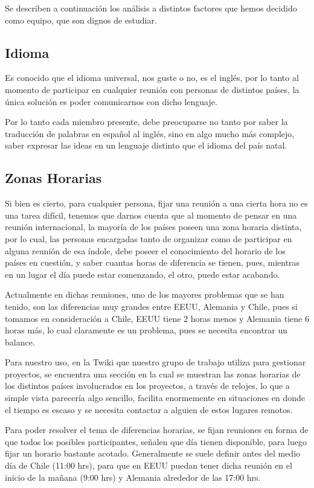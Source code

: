 Se describen a continuación los análisis a distintos factores que hemos
decidido como equipo, que son dignos de estudiar.

\subsection{Idioma}
Es conocido que el idioma universal, nos guste o no,
es el inglés, por lo tanto al momento de participar en
cualquier reunión con personas de distintos países,
la única solución es poder comunicarnos con dicho lenguaje.

Por lo tanto cada miembro presente, debe preocuparse no tanto
por saber la traducción de palabras en español al inglés,
sino en algo mucho más complejo, saber expresar las ideas
en un lenguaje distinto que el idioma del país natal.


\subsection{Zonas Horarias}
Si bien es cierto, para cualquier persona, fijar una reunión
a una cierta hora no es una tarea difícil, tenemos que darnos
cuenta que al momento de pensar en una reunión internacional,
la mayoría de los países poseen una zona horaria distinta, por
lo cual, las personas encargadas tanto de organizar como de
participar en alguna reunión de esa índole, debe poseer el
conocimiento del horario de los países en cuestión,
y saber cuantas horas de diferencia se tienen, pues, mientras
en un lugar el día puede estar comenzando, el otro, puede estar
acabando.

Actualmente en dichas reuniones, uno de los mayores problemas
que se han tenido, son las diferencias muy grandes entre EEUU, 
Alemania y Chile, pues si tomamos en consideración a Chile,
EEUU tiene 2 horas menos y Alemania tiene 6 horas más, lo cual
claramente es un problema, pues se necesita encontrar un balance.

Para nuestro uso, en la Twiki que nuestro grupo de trabajo
utiliza para gestionar proyectos, se encuentra una sección en la cual
se muestran las zonas horarias de los distintos países involucrados
en los proyectos, a través de relojes, lo que a simple vista parecería
algo sencillo, facilita enormemente en situaciones en donde el tiempo
es escaso y se necesita contactar a alguien de estos lugares remotos.

Para poder resolver el tema de diferencias horarias, se fijan reuniones
en forma de que todos los posibles participantes, señalen que día tienen
disponible, para luego fijar un horario bastante acotado. Generalmente
se suele definir antes del medio día de Chile (11:00 hrs), para que en EEUU puedan 
tener dicha reunión en el inicio de la mañana (9:00 hrs) y Alemania alrededor
de las 17:00 hrs.

